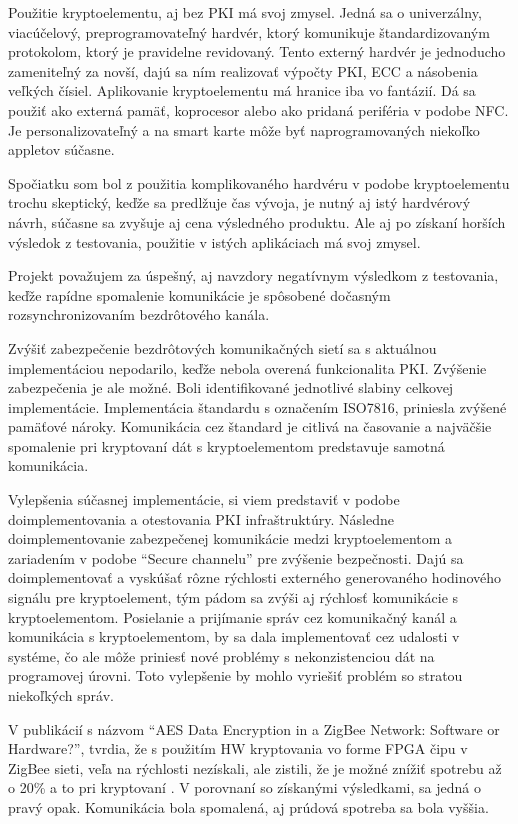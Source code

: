 \documentclass[12pt,a4paper,oneside,openright]{report}
\newcommand{\quotes}[1]{``#1''}
\begin{document}
Použitie kryptoelementu, aj bez PKI má svoj zmysel. Jedná sa o univerzálny, viacúčelový, preprogramovateľný hardvér, ktorý komunikuje štandardizovaným protokolom, ktorý je pravidelne revidovaný. Tento externý hardvér je jednoducho zameniteľný za novší, dajú sa ním realizovať výpočty PKI, ECC a násobenia veľkých čísiel. Aplikovanie kryptoelementu má hranice iba vo fantázií. Dá sa použiť ako externá pamäť, koprocesor alebo ako pridaná periféria v podobe NFC. Je personalizovateľný a na smart karte môže byť naprogramovaných niekoľko appletov súčasne.

Spočiatku som bol z použitia komplikovaného hardvéru v podobe kryptoelementu trochu skeptický, keďže sa predlžuje čas vývoja, je nutný aj istý hardvérový návrh, súčasne sa zvyšuje aj cena výsledného produktu. Ale aj po získaní horších výsledok z testovania, použitie v istých aplikáciach má svoj zmysel.

Projekt považujem za úspešný, aj navzdory negatívnym výsledkom z testovania, keďže rapídne spomalenie komunikácie je spôsobené dočasným rozsynchronizovaním bezdrôtového kanála.

Zvýšiť zabezpečenie bezdrôtových komunikačných sietí sa s aktuálnou implementáciou nepodarilo, keďže nebola overená funkcionalita PKI. Zvýšenie zabezpečenia je ale možné. Boli identifikované jednotlivé slabiny celkovej implementácie. Implementácia štandardu s označením ISO7816, priniesla zvýšené pamäťové nároky. Komunikácia cez štandard je citlivá na časovanie a najväčšie spomalenie pri kryptovaní dát s kryptoelementom predstavuje samotná komunikácia.

Vylepšenia súčasnej implementácie, si viem predstaviť v podobe doimplementovania a otestovania PKI infraštruktúry. Následne doimplementovanie zabezpečenej komunikácie medzi kryptoelementom a zariadením v podobe \quotes{Secure channelu} pre zvýšenie bezpečnosti. Dajú sa doimplementovať a vyskúšať rôzne rýchlosti externého generovaného hodinového signálu pre kryptoelement, tým pádom sa zvýši aj rýchlosť komunikácie s kryptoelementom. Posielanie a prijímanie správ cez komunikačný kanál a komunikácia s kryptoelementom, by sa dala implementovať cez udalosti v systéme, čo ale môže priniesť nové problémy s nekonzistenciou dát na programovej úrovni. Toto vylepšenie by mohlo vyriešiť problém so stratou niekoľkých správ.

V publikácií s názvom \quotes{AES Data Encryption in a ZigBee Network: Software or Hardware?}, tvrdia, že s použitím HW kryptovania vo forme FPGA čipu v ZigBee sieti, veľa na rýchlosti nezískali, ale zistili, že je možné znížiť spotrebu až o 20\% a to pri kryptovaní \cite{Ottoy2010}. V porovnaní so získanými výsledkami, sa jedná o pravý opak. Komunikácia bola spomalená, aj prúdová spotreba sa bola vyššia.
\end{document}
